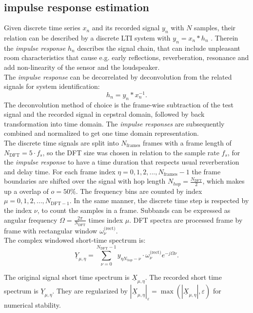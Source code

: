 \documentclass{article}
\begin{document}
\subsection{impulse response estimation}
Given discrete time series $x_n$ and its recorded signal $y_n$ with $N$ samples, their relation can be described by a discrete LTI system with $y_n=x_n*h_n$ \cite{Fliege1991}. Therein the \textit{impulse response} $h_n$ describes the signal chain, that can include unpleasant room characteristics that cause e.g. early reflections, reverberation, resonance and add non-linearity of the sensor and the loudspeaker.
\\
The \textit{impulse response} can be decorrelated by deconvolution from the related signals for system identification:  
\begin{equation}
h_n=y_n*x_n^{-1}.
\end{equation}
The deconvolution method of choice is the frame-wise subtraction of the test signal and the recorded signal in cepstral domain, followed by back transformation into time domain. The \textit{impulse responses} are subsequently combined and normalized to get one time domain representation. \\  
The discrete time signals are split into $N_{\text{frames}}$ frames with a frame length of $ N_{\text{DFT}}= 5 \cdot f_s $, so the DFT size was chosen in relation to the sample rate $f_s$, for the \textit{impulse response} to have a time duration that respects usual reverberation and delay time. 
For each frame index $ \eta = 0,1,2,..., N_{\text{frames}}-1 $ the frame boundaries are shifted over the signal with hop length $ N_{hop}=\frac{N_{\text{DFT}}}{2}$, which makes up a overlap of $o=50\%$. 
The frequency bins are counted by index $\mu=0,1,2,...,N_{\text{DFT}-1}$. In the same manner, the discrete time step is respected by the index $\nu$, to count the samples in a frame.
Subbands can be expressed as angular frequency $\Omega=\frac{2 \pi}{N_{\text{DFT}}}$ times index $\mu$.
DFT spectra are processed frame by frame with rectangular window $\omega^{\text{(rect)}}_\nu$. \\
The complex windowed short-time spectrum is:
\begin{equation}
\label{eq:STFT}
\underline{Y}_{\mu, \eta}=\sum_{\nu=0}^{N_{\text{DFT}}-1}y_{\eta N_{hop}-\nu} \cdot \omega^{\text{(rect)}}_\nu e^{-j\Omega \nu}.
\end{equation}

The original signal short time spectrum is $\underline{X}_{\mu, \eta}$.
The recorded short time spectrum is $\underline{Y}_{\mu, \eta}$. 
They are regularized by $|\underline{X}_{\mu, \eta}|_{\varepsilon} = \max(|\underline{X}_{\mu, \eta}|, \varepsilon)$ for numerical stability.
\end{document}
